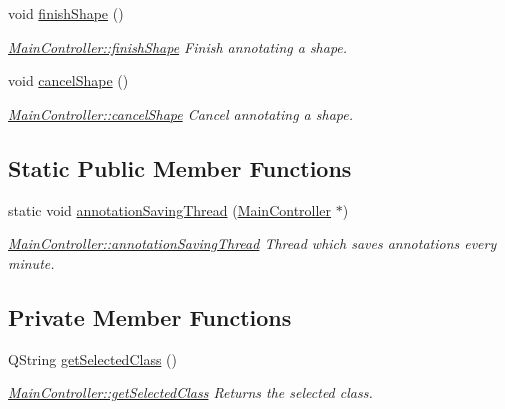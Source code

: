 \begin{DoxyCompactItemize}
\mbox{\label{classMainController_afa0ea947f033ff9fac5b798378d03667}} 
void \hyperlink{classMainController_afa0ea947f033ff9fac5b798378d03667}{finish\+Shape} ()
\begin{DoxyCompactList}\small\item\em \hyperlink{classMainController_afa0ea947f033ff9fac5b798378d03667}{Main\+Controller\+::finish\+Shape} Finish annotating a shape. \end{DoxyCompactList}\item 
\mbox{\label{classMainController_a7855f2a07593bd632e36bed1452386b2}} 
void \hyperlink{classMainController_a7855f2a07593bd632e36bed1452386b2}{cancel\+Shape} ()
\begin{DoxyCompactList}\small\item\em \hyperlink{classMainController_a7855f2a07593bd632e36bed1452386b2}{Main\+Controller\+::cancel\+Shape} Cancel annotating a shape. \end{DoxyCompactList}\end{DoxyCompactItemize}
\subsection*{Static Public Member Functions}
\begin{DoxyCompactItemize}
\item 
static void \hyperlink{classMainController_ae4fbe8a429f2181ae8e6c721ea7b113b}{annotation\+Saving\+Thread} (\hyperlink{classMainController}{Main\+Controller} $\ast$)
\begin{DoxyCompactList}\small\item\em \hyperlink{classMainController_ae4fbe8a429f2181ae8e6c721ea7b113b}{Main\+Controller\+::annotation\+Saving\+Thread} Thread which saves annotations every minute. \end{DoxyCompactList}\end{DoxyCompactItemize}
\subsection*{Private Member Functions}
\begin{DoxyCompactItemize}
\item 
Q\+String \hyperlink{classMainController_a1ffca82d85f234d7427385dd28bb2160}{get\+Selected\+Class} ()
\begin{DoxyCompactList}\small\item\em \hyperlink{classMainController_a1ffca82d85f234d7427385dd28bb2160}{Main\+Controller\+::get\+Selected\+Class} Returns the selected class. \end{DoxyCompactList}\end{DoxyCompactItemize}
